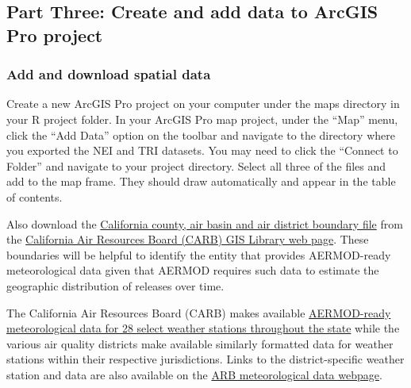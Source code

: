 \documentclass[
  letterpaper,
  DIV=11,
  numbers=noendperiod]{scrartcl}
\begin{document}
\hypertarget{part-three-create-and-add-data-to-arcgis-pro-project}{%
\subsection{Part Three: Create and add data to ArcGIS Pro
project}\label{part-three-create-and-add-data-to-arcgis-pro-project}}

\hypertarget{add-and-download-spatial-data}{%
\subsubsection{Add and download spatial
data}\label{add-and-download-spatial-data}}

Create a new ArcGIS Pro project on your computer under the maps
directory in your R project folder. In your ArcGIS Pro map project,
under the ``Map'' menu, click the ``Add Data'' option on the toolbar and
navigate to the directory where you exported the NEI and TRI datasets.
You may need to click the ``Connect to Folder'' and navigate to your
project directory. Select all three of the files and add to the map
frame. They should draw automatically and appear in the table of
contents.

Also download the
\href{https://ww3.arb.ca.gov/ei/gislib/boundaries/ca_co_ab_dis.zip}{California
county, air basin and air district boundary file} from the
\href{https://ww2.arb.ca.gov/geographical-information-system-gis-library}{California
Air Resources Board (CARB) GIS Library web page}. These boundaries will
be helpful to identify the entity that provides AERMOD-ready
meteorological data given that AERMOD requires such data to estimate the
geographic distribution of releases over time.

\begin{tcolorbox}[enhanced jigsaw, colbacktitle=quarto-callout-note-color!10!white, rightrule=.15mm, title=\textcolor{quarto-callout-note-color}{\faInfo}\hspace{0.5em}{Meteorological data}, bottomrule=.15mm, opacityback=0, bottomtitle=1mm, leftrule=.75mm, opacitybacktitle=0.6, colframe=quarto-callout-note-color-frame, titlerule=0mm, left=2mm, toprule=.15mm, breakable, arc=.35mm, colback=white, toptitle=1mm, coltitle=black]
The California Air Resources Board (CARB) makes available
\href{https://ww2.arb.ca.gov/resources/documents/harp-aermod-meteorological-files}{AERMOD-ready
meteorological data for 28 select weather stations throughout the state}
while the various air quality districts make available similarly
formatted data for weather stations within their respective
jurisdictions. Links to the district-specific weather station and data
are also available on the
\href{https://ww2.arb.ca.gov/resources/documents/harp-aermod-meteorological-files}{ARB
meteorological data webpage}.
\end{tcolorbox}
\end{document}
